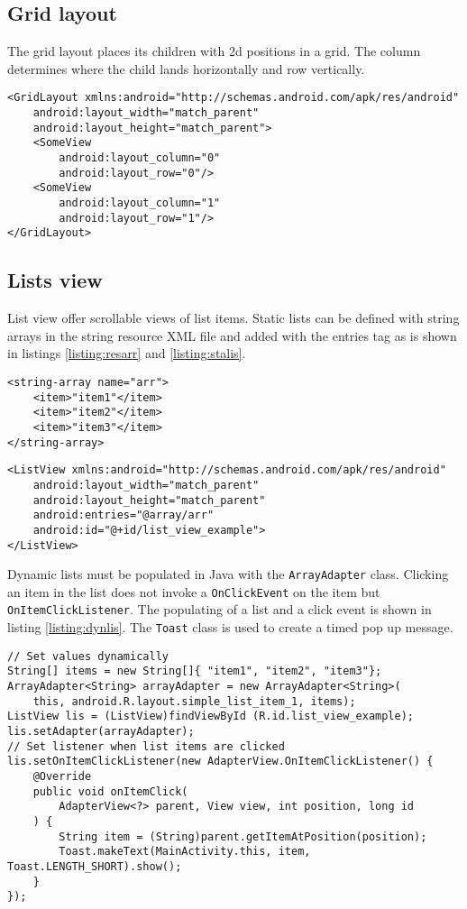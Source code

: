 \subsection{Grid layout}
The grid layout places its children with 2d positions in a grid. The column determines where the child lands horizontally and row vertically.
\begin{lstlisting}[style=A_XML, caption={Grid layout declaration}, label = {listing:gridlay}]
<GridLayout xmlns:android="http://schemas.android.com/apk/res/android"
    android:layout_width="match_parent"
    android:layout_height="match_parent">
    <SomeView
        android:layout_column="0"
        android:layout_row="0"/>
    <SomeView
        android:layout_column="1"
        android:layout_row="1"/>
</GridLayout>
\end{lstlisting}

\subsection{Lists view}
List view offer scrollable views of list items. Static lists can be defined with string arrays in the string resource XML file and added with the entries tag as is shown in listings \ref{listing:resarr} and \ref{listing:stalis}.
\begin{lstlisting}[style=A_XML, caption={Resource string array}, label = {listing:resarr}]
<string-array name="arr">
    <item>"item1"</item>
    <item>"item2"</item>
    <item>"item3"</item>
</string-array>
\end{lstlisting}
\begin{lstlisting}[style=A_XML, caption={Static list}, label = {listing:stalis}]
<ListView xmlns:android="http://schemas.android.com/apk/res/android"
    android:layout_width="match_parent"
    android:layout_height="match_parent"
    android:entries="@array/arr"
    android:id="@+id/list_view_example">
</ListView>
\end{lstlisting}

Dynamic lists must be populated in Java with the \texttt{ArrayAdapter} class. Clicking an item in the list does not invoke a \texttt{OnClickEvent} on the item but \texttt{OnItemClickListener}. The populating of a list and a click event is shown in listing \ref{listing:dynlis}. The \texttt{Toast} class is used to create a timed pop up message.

\begin{lstlisting}[style=A_Java, caption={Dynamic list}, label = {listing:dynlis}]
// Set values dynamically
String[] items = new String[]{ "item1", "item2", "item3"};
ArrayAdapter<String> arrayAdapter = new ArrayAdapter<String>(
    this, android.R.layout.simple_list_item_1, items);
ListView lis = (ListView)findViewById (R.id.list_view_example);
lis.setAdapter(arrayAdapter);
// Set listener when list items are clicked
lis.setOnItemClickListener(new AdapterView.OnItemClickListener() {
    @Override
    public void onItemClick(
        AdapterView<?> parent, View view, int position, long id
    ) {
        String item = (String)parent.getItemAtPosition(position);
        Toast.makeText(MainActivity.this, item, Toast.LENGTH_SHORT).show();
    }
});

\end{lstlisting}

